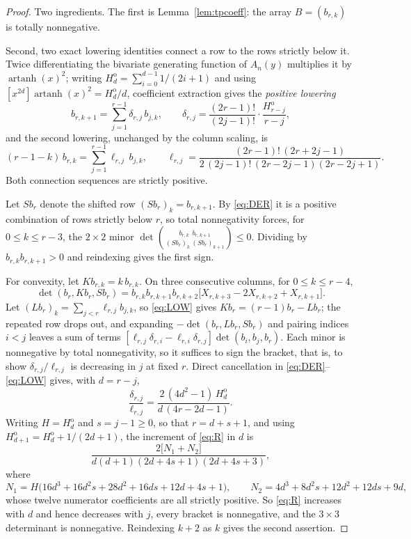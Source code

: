 \documentclass[11pt,a4paper]{article}
\theoremstyle{plain}
\theoremstyle{definition}
\theoremstyle{remark}
\DeclareMathOperator{\artanh}{artanh}
\begin{document}
\begin{proof}
Two ingredients. The first is Lemma~\ref{lem:tpcoeff}: the array $B=(b_{r,k})$
is totally nonnegative.

Second, two exact lowering identities connect a row to the rows strictly below
it. Twice differentiating the bivariate generating function of $A_n(y)$
multiplies it by $\artanh(x)^2$; writing $H^{\mathrm o}_d=\sum_{i=0}^{d-1}
1/(2i+1)$ and using $[x^{2d}]\artanh(x)^2=H^{\mathrm o}_d/d$, coefficient
extraction gives the \emph{positive lowering}
\begin{equation}\label{eq:DER}
  b_{r,k+1}=\sum_{j=1}^{r-1}\delta_{r,j}\,b_{j,k},
  \qquad
  \delta_{r,j}=\frac{(2r-1)!}{(2j-1)!}\cdot\frac{H^{\mathrm o}_{r-j}}{r-j},
\end{equation}
and the second lowering, unchanged by the column scaling, is
\begin{equation}\label{eq:LOW}
  (r-1-k)\,b_{r,k}=\sum_{j=1}^{r-1}\ell_{r,j}\,b_{j,k},
  \qquad
  \ell_{r,j}=\frac{(2r-1)!\,(2r+2j-1)}
                  {2\,(2j-1)!\,(2r-2j-1)(2r-2j+1)} .
\end{equation}
Both connection sequences are strictly positive.

Let $Sb_r$ denote the shifted row $(Sb_r)_k=b_{r,k+1}$. By \eqref{eq:DER} it is
a positive combination of rows strictly below $r$, so total nonnegativity forces,
for $0\le k\le r-3$, the $2\times2$ minor
$\det\binom{b_{r,k}\ \ b_{r,k+1}}{(Sb_r)_k\ (Sb_r)_{k+1}}\le0$.
Dividing by $b_{r,k}b_{r,k+1}>0$ and reindexing gives the first sign.

For convexity, let $Kb_{r,k}=k\,b_{r,k}$. On three consecutive columns, for
$0\le k\le r-4$,
\[
  \det(b_r,Kb_r,Sb_r)
   =b_{r,k}b_{r,k+1}b_{r,k+2}\bigl[X_{r,k+3}-2X_{r,k+2}+X_{r,k+1}\bigr].
\]
Let $(Lb_r)_k=\sum_{j<r}\ell_{r,j}b_{j,k}$, so \eqref{eq:LOW} gives
$Kb_r=(r-1)b_r-Lb_r$; the repeated row drops out,
and expanding $-\det(b_r,Lb_r,Sb_r)$ and pairing indices $i<j$ leaves a sum of
terms $[\ell_{r,j}\delta_{r,i}-\ell_{r,i}\delta_{r,j}]\det(b_i,b_j,b_r)$. Each
minor is nonnegative by total nonnegativity, so it suffices to sign the bracket,
that is, to show $\delta_{r,j}/\ell_{r,j}$ is decreasing in $j$ at fixed $r$.
Direct cancellation in \eqref{eq:DER}--\eqref{eq:LOW} gives, with $d=r-j$,
\begin{equation}\label{eq:R}
  \frac{\delta_{r,j}}{\ell_{r,j}}
   =\frac{2\,(4d^2-1)\,H^{\mathrm o}_d}{d\,(4r-2d-1)} .
\end{equation}
Writing $H=H^{\mathrm o}_d$ and $s=j-1\ge0$, so that $r=d+s+1$, and using
$H^{\mathrm o}_{d+1}=H^{\mathrm o}_d+1/(2d+1)$, the increment of \eqref{eq:R} in
$d$ is
\[
  \frac{2\bigl[N_1+N_2\bigr]}{d(d+1)(2d+4s+1)(2d+4s+3)},
\]
where
\[
  N_1=H\bigl(16d^3+16d^2s+28d^2+16ds+12d+4s+1\bigr),
  \qquad
  N_2=4d^3+8d^2s+12d^2+12ds+9d,
\]
whose twelve numerator coefficients are all strictly positive. So \eqref{eq:R}
increases with $d$ and hence decreases with $j$, every bracket is nonnegative,
and the $3\times3$ determinant is nonnegative. Reindexing $k+2$ as $k$ gives
the second assertion.
\end{proof}
\end{document}
